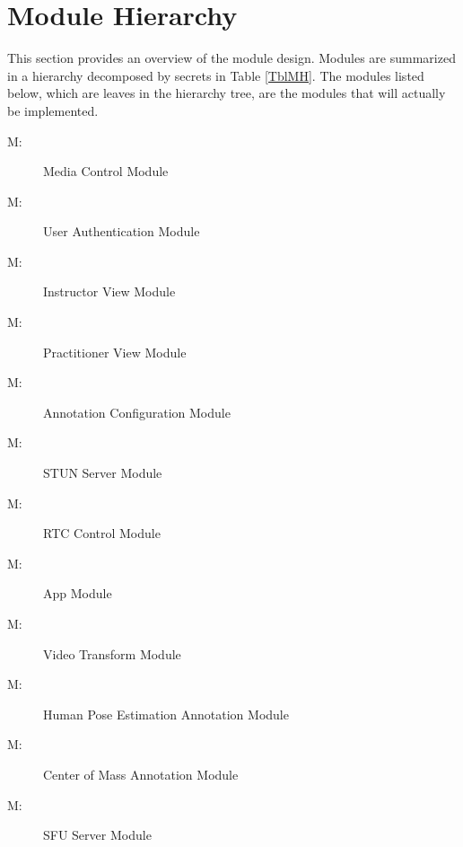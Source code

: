\documentclass[12pt, titlepage]{article}
\newcounter{mnum}
\newcommand{\mthemnum}{M\themnum}
\begin{document}
\section{Module Hierarchy} \label{SecMH}

This section provides an overview of the module design. Modules are summarized
in a hierarchy decomposed by secrets in Table \ref{TblMH}. The modules listed
below, which are leaves in the hierarchy tree, are the modules that will
actually be implemented.

\begin{description}
\item [ \mthemnum \label{mMC}:] Media Control Module
\item [ \mthemnum \label{mUA}:] User Authentication Module
\item [ \mthemnum \label{mIV}:] Instructor View Module
\item [ \mthemnum \label{mPV}:] Practitioner View Module
\item [ \mthemnum \label{mAC}:] Annotation Configuration Module
\item [ \mthemnum \label{mSTU}:] STUN Server Module
\item [ \mthemnum \label{mRTC}:] RTC Control Module
\item [ \mthemnum \label{mAPP}:] App Module
\item [ \mthemnum \label{mVT}:] Video Transform Module
\item [ \mthemnum \label{mHPE}:] Human Pose Estimation Annotation Module
\item [ \mthemnum \label{mCOM}:] Center of Mass Annotation Module
\item [ \mthemnum \label{mSFU}:] SFU Server Module
\end{description}
\end{document}
